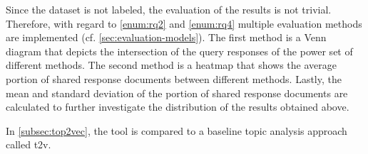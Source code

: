 Since the dataset is not labeled, the evaluation of the results is not trivial.
Therefore, with regard to \ref{enum:rq2} and \ref{enum:rq4} 
multiple evaluation methods are implemented (cf. \autoref{sec:evaluation-models}).
The first method is a Venn diagram that depicts the intersection of the query responses 
of the power set of different methods.
The second method is a heatmap that shows the average portion of shared response documents 
between different methods.
Lastly, the mean and standard deviation of the portion of shared response documents are calculated 
to further investigate the distribution of the results obtained above.

In \autoref{subsec:top2vec}, the tool is compared to a baseline topic analysis approach called \ac{t2v}.